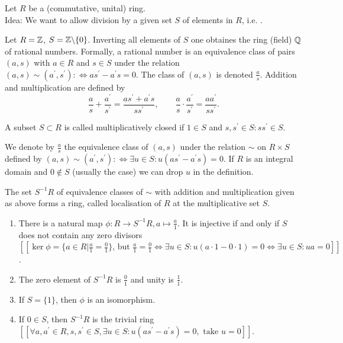 \documentclass[a4paper,11pt]{article}
\begin{document}
			\noindent Let $R$ be a (commutative, unital) ring.
			\\

			Idea: We want to allow division by a given set $S$ of elements in $R$, i.e. .

			\begin{eg}
				Let $R=\mathbb{Z}$, $S=\mathbb{Z}\backslash\{0\}$. Inverting all elements of $S$ one obtaines the ring (field) $\mathbb{Q}$ of rational numbers. Formally, a rational number is an equivalence class of pairs $(a,s)$ with $a\in R$ and $s\in S$ under the relation $(a,s)\sim(a^\prime,s^\prime):\Longleftrightarrow as^\prime-a^\prime s=0$. The class of $(a,s)$ is denoted $\frac{a}{s}$. Addition and multiplication are defined by
				\begin{equation*}
					\frac{a}{s}+\frac{a^\prime}{s^\prime}=\frac{as^\prime+a^\prime s}{ss^\prime},\qquad\frac{a}{s}\cdot\frac{a^\prime}{s^\prime}=\frac{aa^\prime}{ss^\prime}.
				\end{equation*}
			\end{eg}

			\begin{defi}
				A subset $S\subset R$ is called multiplicatively closed if $1\in S$ and $s,s^\prime\in S:ss^\prime\in S$.
			\end{defi}

			We denote by $\frac{a}{s}$ the equivalence class of $(a,s)$ under the relation $\sim$ on $R\times S$ defined by $(a,s)\sim(a^\prime,s^\prime):\Longleftrightarrow\exists u\in S:u(as^\prime-a^\prime s)=0$. If $R$ is an integral domain and $0\notin S$ (usually the case) we can drop $u$ in the definition.

			\begin{prop}
				The set $S^{-1}R$ of equivalence classes of $\sim$ with addition and multiplication given as above forms a ring, called localisation of $R$ at the multiplicative set $S$.
			\end{prop}

			\begin{remark}
				\begin{enumerate}
					\item There is a natural map $\phi:R\rightarrow S^{-1}R, a\mapsto\frac{a}{1}$. It is injective if and only if $S$ does not contain any zero divisors $[[\ker\phi=\{a\in R|\frac{a}{1}=\frac{0}{1}\}\text{, but }\frac{a}{1}=\frac{0}{1}\Longleftrightarrow\exists u\in S:u(a\cdot 1-0\cdot 1)=0\Longleftrightarrow\exists u\in S:ua=0]]$.
					\item The zero element of $S^{-1}R$ is $\frac{0}{1}$ and unity is $\frac{1}{1}$.
					\item If $S=\{1\}$, then $\phi$ is an isomorphism.
					\item If $0\in S$, then $S^{-1}R$ is the trivial ring $[[\forall a,a^\prime\in R,s,s^\prime\in S,\exists u\in S:u(as^\prime-a^\prime s)=0,\text{ take }u=0]]$. 
				\end{enumerate}
			\end{remark}
\end{document}
